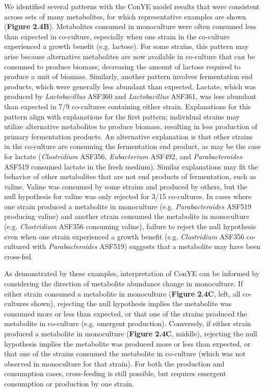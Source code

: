 \documentclass[11pt,onecolumn,notitlepage,openany,twoside]{book}
\begin{document}
\begin{refsection}
We identified several patterns with the ConYE model results that were consistent across sets of many metabolites, for which representative examples are shown (\textbf{Figure 2.4B}). Metabolites consumed in monoculture were often consumed less than expected in co-culture, especially when one strain in the co-culture experienced a growth benefit (e.g. lactose). For some strains, this pattern may arise because alternative metabolites are now available in co-culture that can be consumed to produce biomass, decreasing the amount of lactose required to produce a unit of biomass. Similarly, another pattern involves fermentation end products, which were generally less abundant than expected. Lactate, which was produced by \textit{Lactobacillus} ASF360 and \textit{Lactobacillus} ASF361, was less abundant than expected in 7/9 co-cultures containing either strain. Explanations for this pattern align with explanations for the first pattern; individual strains may utilize alternative metabolites to produce biomass, resulting in less production of primary fermentation products. An alternative explanation is that other strains in the co-culture are consuming the fermentation end product, as may be the case for lactate (\textit{Clostridium} ASF356, \textit{Eubacterium} ASF492, and \textit{Parabacteroides} ASF519 consumed lactate in the fresh medium). Similar explanations may fit the behavior of other metabolites that are not end products of fermentation, such as valine. Valine was consumed by some strains and produced by others, but the null hypothesis for valine was only rejected for 3/15 co-cultures. In cases where one strain produced a metabolite in monoculture (e.g. \textit{Parabacteroides} ASF519 producing valine) and another strain consumed the metabolite in monoculture (e.g. \textit{Clostridium} ASF356 consuming valine), failure to reject the null hypothesis even when one strain experienced a growth benefit (e.g. \textit{Clostridium} ASF356 co-cultured with \textit{Parabacteroides} ASF519) suggests that a metabolite may have been cross-fed.

As demonstrated by these examples, interpretation of ConYE can be informed by considering the direction of metabolite abundance change in monoculture. If either strain consumed a metabolite in monoculture (\textbf{Figure 2.4C}, left, all co-cultures shown), rejecting the null hypothesis implies the metabolite was consumed more or less than expected, or that one of the strains produced the metabolite in co-culture (e.g. emergent production). Conversely, if either strain produced a metabolite in monoculture (\textbf{Figure 2.4C}, middle), rejecting the null hypothesis implies the metabolite was produced more or less than expected, or that one of the strains consumed the metabolite in co-culture (which was not observed in monoculture for that strain). For both the production and consumption cases, cross-feeding is still possible, but requires emergent consumption or production by one strain.


\end{refsection}
\end{document}
